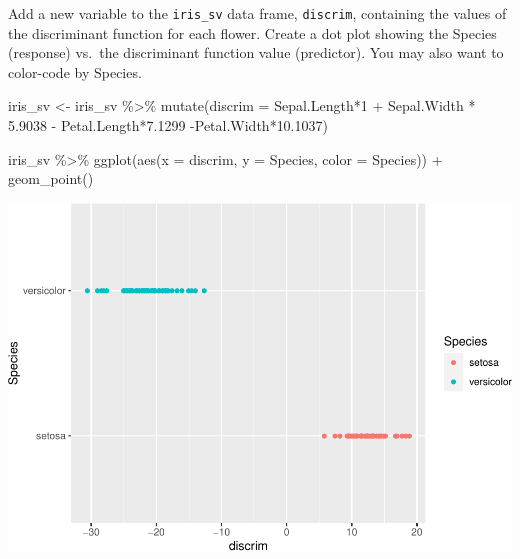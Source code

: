 \documentclass[
]{article}
\newenvironment{Shaded}{\begin{snugshade}}{\end{snugshade}}
\newcommand{\AttributeTok}[1]{\textcolor[rgb]{0.77,0.63,0.00}{#1}}
\newcommand{\DecValTok}[1]{\textcolor[rgb]{0.00,0.00,0.81}{#1}}
\newcommand{\FloatTok}[1]{\textcolor[rgb]{0.00,0.00,0.81}{#1}}
\newcommand{\FunctionTok}[1]{\textcolor[rgb]{0.00,0.00,0.00}{#1}}
\newcommand{\NormalTok}[1]{#1}
\newcommand{\OtherTok}[1]{\textcolor[rgb]{0.56,0.35,0.01}{#1}}
\newcommand{\SpecialCharTok}[1]{\textcolor[rgb]{0.00,0.00,0.00}{#1}}
\begin{document}
Add a new variable to the \texttt{iris\_sv} data frame,
\texttt{discrim}, containing the values of the discriminant function for
each flower. Create a dot plot showing the Species (response) vs.~the
discriminant function value (predictor). You may also want to color-code
by Species.

\begin{Shaded}
\begin{Highlighting}[]
\NormalTok{iris\_sv }\OtherTok{\textless{}{-}}\NormalTok{ iris\_sv }\SpecialCharTok{\%\textgreater{}\%} 
  \FunctionTok{mutate}\NormalTok{(}\AttributeTok{discrim =}\NormalTok{ Sepal.Length}\SpecialCharTok{*}\DecValTok{1} \SpecialCharTok{+}\NormalTok{ Sepal.Width }\SpecialCharTok{*} \FloatTok{5.9038} \SpecialCharTok{{-}}\NormalTok{ Petal.Length}\SpecialCharTok{*}\FloatTok{7.1299} \SpecialCharTok{{-}}\NormalTok{Petal.Width}\SpecialCharTok{*}\FloatTok{10.1037}\NormalTok{)}
\end{Highlighting}
\end{Shaded}

\begin{Shaded}
\begin{Highlighting}[]
\NormalTok{iris\_sv }\SpecialCharTok{\%\textgreater{}\%} 
  \FunctionTok{ggplot}\NormalTok{(}\FunctionTok{aes}\NormalTok{(}\AttributeTok{x =}\NormalTok{ discrim, }\AttributeTok{y =}\NormalTok{ Species, }\AttributeTok{color =}\NormalTok{ Species)) }\SpecialCharTok{+}
  \FunctionTok{geom\_point}\NormalTok{() }
\end{Highlighting}
\end{Shaded}

\includegraphics{Homework4_files/figure-latex/unnamed-chunk-4-1.pdf}
\end{document}
